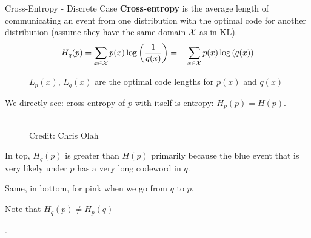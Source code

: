 \begin{vbframe} {Cross-Entropy - Discrete Case}
\framebreak
\textbf{Cross-entropy} is the average length of communicating an event from one distribution with the optimal code for another distribution (assume they have the same domain $\mathcal{X}$ as in KL).
  $$ H_q(p) = \sum_{x \in \mathcal{X}} p(x) \log\left(\frac{1}{q(x)}\right) = - \sum_{x \in \mathcal{X}} p(x) \log\left(q(x)\right) $$

\begin{figure}
    \centering
      \caption{\footnotesize{$L_p(x)$, $L_q(x)$ are the optimal code lengths for $p(x)$ and $q(x)$}}
  \end{figure}
  
We directly see: cross-entropy of $p$ with itself is entropy: $H_p(p) = H(p)$.
  
\framebreak
  \begin{figure}
    \centering
      \tiny{\\ Credit: Chris Olah}
  \end{figure}
  
  \begin{itemize}
    \item \small{In top, $H_q(p)$ is greater than $H(p)$ primarily because the blue event that is very likely under $p$ has a very long codeword in $q$.
    \item Same, in bottom, for pink when we go from $q$ to $p$.
    \item Note that $H_q(p) \neq H_p(q)$}. 
  \end{itemize}


\end{vbframe}
